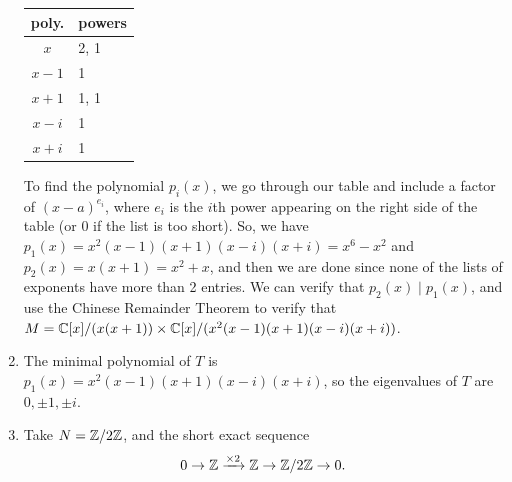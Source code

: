 \begin{solution}
\begin{enumerate}
    \begin{minipage}{.2\textwidth}
    \begin{tabular}{c|l}
        poly. & powers \\
        \hline
        $x$ & 2, 1 \\
        $x-1$ & 1 \\
        $x+1$ & 1, 1 \\
        $x-i$ & 1 \\
        $x+i$ & 1
    \end{tabular}
    \end{minipage}
    \begin{minipage}{.75\textwidth}
    To find the polynomial $p_i(x)$, we go through our table and include a factor of $(x-a)^{e_i}$, where $e_i$ is the $i$th power appearing on the right side of the table (or 0 if the list is too short). So, we have $p_1(x) = x^2(x-1)(x+1)(x-i)(x+i) = x^6-x^2$ and $p_2(x) = x(x+1) = x^2+x$, and then we are done since none of the lists of exponents have more than 2 entries. We can verify that $p_2(x) \mid p_1(x)$, and use the Chinese Remainder Theorem to verify that $M = \C[x]/(x(x+1)) \times \C[x]/(x^2(x-1)(x+1)(x-i)(x+i))$.
    \end{minipage}
    \item The minimal polynomial of $T$ is $p_1(x) = x^2(x-1)(x+1)(x-i)(x+i)$, so the eigenvalues of $T$ are $0,\pm 1, \pm i$.
    \item Take $N = \mathbb{Z}/2\mathbb{Z}$, and the short exact sequence
    \[0 \to \mathbb{Z} \xrightarrow{\times 2} \mathbb{Z} \to \mathbb{Z}/2\mathbb{Z} \to 0.\]
\end{enumerate}
\end{solution}

